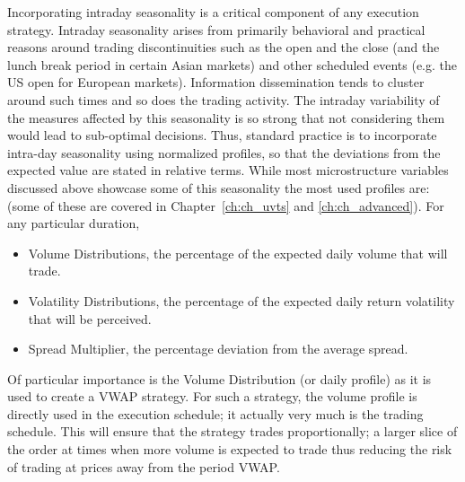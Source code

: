 Incorporating intraday seasonality is a critical component of any execution strategy. Intraday seasonality arises from primarily behavioral and practical reasons around trading discontinuities such as the open and the close (and the lunch break period in certain Asian markets) and other scheduled events (e.g. the US open for European markets). Information dissemination tends to cluster around such times and so does the trading activity. The intraday variability of the measures affected by this seasonality is so strong that not considering them would lead to sub-optimal decisions. Thus, standard practice is to incorporate intra-day seasonality using normalized profiles, so that the deviations from the expected value are stated in relative terms. While most microstructure variables discussed above showcase some of this seasonality the most used profiles are: (some of these are covered in Chapter~\ref{ch:ch_uvts} and \ref{ch:ch_advanced}). For any particular duration,
\begin{itemize}
	\item Volume Distributions, the percentage of the expected daily volume that will trade.
	\item Volatility Distributions, the percentage of the expected daily return volatility that will  be perceived.
	\item Spread Multiplier, the percentage deviation from the average spread.
\end{itemize}
Of particular importance is the Volume Distribution (or daily profile) as it is used to create a VWAP strategy. For such a strategy, the volume profile is directly used in the execution schedule; it actually very much is the trading schedule. This will ensure that the strategy trades proportionally; a larger slice of the order at times when more volume is expected to trade thus reducing the risk of trading at prices away from the period VWAP.


